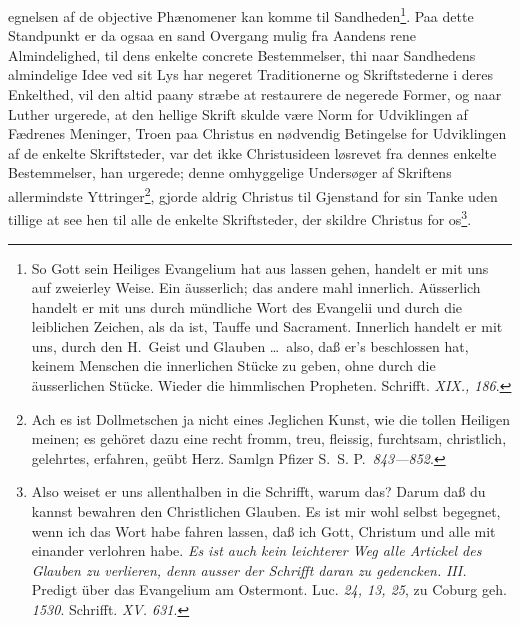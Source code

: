 \documentclass[12pt]{book}
\newcommand{\opage}[1]{\marginnote{\footnotesize\textit{[#1]}}}
\begin{document}
\opage{67}\setcounter{footnote}{0}%
egnelsen af de objective Phænomener kan komme til Sandheden\footnote{So Gott
sein Heiliges Evangelium hat aus lassen gehen, handelt er mit uns auf
zweierley Weise. Ein äusserlich; das andere mahl innerlich. Aüsserlich handelt
er mit uns durch mündliche Wort des Evangelii und durch die leiblichen
Zeichen, als da ist, Tauffe und Sacrament. Innerlich handelt er mit uns, durch
den H.~Geist und Glauben \ldots\ also, daß er's beschlossen hat, keinem
Menschen die innerlichen Stücke zu geben, ohne durch die äusserlichen Stücke.
Wieder die himmlischen Propheten. Schrifft. \textit{XIX., 186}.}. Paa dette
Standpunkt er da ogsaa en sand Overgang mulig fra Aandens rene Almindelighed,
til dens enkelte concrete Bestemmelser, thi naar Sandhedens almindelige Idee
ved sit Lys har negeret Traditionerne og Skriftstederne i deres Enkelthed, vil
den altid paany stræbe at restaurere de negerede Former, og naar Luther
urgerede, at den hellige Skrift skulde være Norm for Udviklingen af Fædrenes
Meninger, Troen paa Christus en nødvendig Betingelse for Udviklingen af de
enkelte Skriftsteder, var det ikke Christusideen løsrevet fra dennes enkelte
Bestemmelser, han urgerede; denne omhyggelige Undersøger af Skriftens
allermindste Yttringer\footnote{Ach es ist Dollmetschen ja nicht eines
Jeglichen Kunst, wie die tollen Heiligen meinen; es gehöret dazu eine recht
fromm, treu, fleissig, furchtsam, christlich, gelehrtes, erfahren, geübt Herz.
Samlgn Pfizer S.~S. P.~\textit{843---852}.}, gjorde aldrig Christus til
Gjenstand for sin Tanke uden tillige at see hen til alle de enkelte
Skriftsteder, der skildre Christus for os\footnote{Also weiset er uns
allenthalben in die Schrifft, warum das? Darum daß du kannst bewahren den
Christlichen Glauben. Es ist mir wohl selbst begegnet, wenn ich das Wort habe
fahren lassen, daß ich Gott, Christum und alle mit einander verlohren habe.
\emph{Es ist auch kein leichterer Weg alle Artickel des Glauben zu verlieren,
denn ausser der Schrifft daran zu gedencken.} \textit{III.} Predigt über das
Evangelium am Ostermont. Luc. \textit{24, 13, 25}, zu Coburg geh.
\textit{1530}. Schrifft. \textit{XV. 631}.}.
\end{document}

